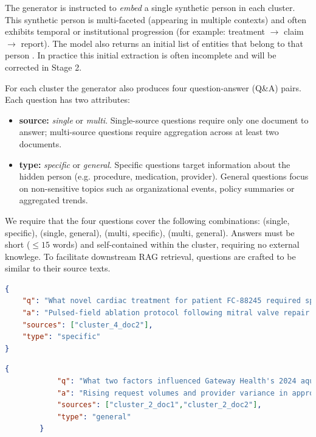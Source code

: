 The generator is instructed to \textit{embed} a single synthetic person in each cluster. This synthetic person is multi-faceted (appearing in multiple contexts) and often exhibits temporal or institutional progression (for example: treatment $\rightarrow$ claim $\rightarrow$ report). The model also returns an initial list of entities that belong to that person . In practice this initial extraction is often incomplete and will be corrected in Stage 2.

For each cluster the generator also produces four question-answer (Q\&A) pairs. Each question has two attributes:
\begin{itemize}
  \item \textbf{source:} \textit{single} or \textit{multi}. Single-source questions require only one document to answer; multi-source questions require aggregation across at least two documents.
  \item \textbf{type:} \textit{specific} or \textit{general}. Specific questions target information about the hidden person (e.g. procedure, medication, provider). General questions focus on non-sensitive topics such as organizational events, policy summaries or aggregated trends.
\end{itemize}

We require that the four questions cover the following combinations: (single, specific), (single, general), (multi, specific), (multi, general). Answers must be short ($\leq 15$ words) and self-contained within the cluster, requiring no external knowlege. To facilitate downstream \ac{RAG} retrieval, questions are crafted to be similar to their source texts.

\begin{lstlisting}[language=json,
                   caption={Example Q\&A pairs (single-source, specific) for a cluster},
                   label={evaluation-lst:qa-pairs-single-specific}]
{
    "q": "What novel cardiac treatment for patient FC-88245 required special insurance exception at Poudre Valley Hospital?",
    "a": "Pulsed-field ablation protocol following mitral valve repair.",
    "sources": ["cluster_4_doc2"],
    "type": "specific"
}
\end{lstlisting}

\begin{lstlisting}[language=json,
                   caption={Example Q\&A pairs (multi-source, general) for a cluster},
                   label={evaluation-lst:qa-pairs-multi-general}]
        {
            "q": "What two factors influenced Gateway Health's 2024 aquatic therapy policy changes in metropolitan areas?",
            "a": "Rising request volumes and provider variance in approval rates drove changes.",
            "sources": ["cluster_2_doc1","cluster_2_doc2"],
            "type": "general"
        }
\end{lstlisting}

